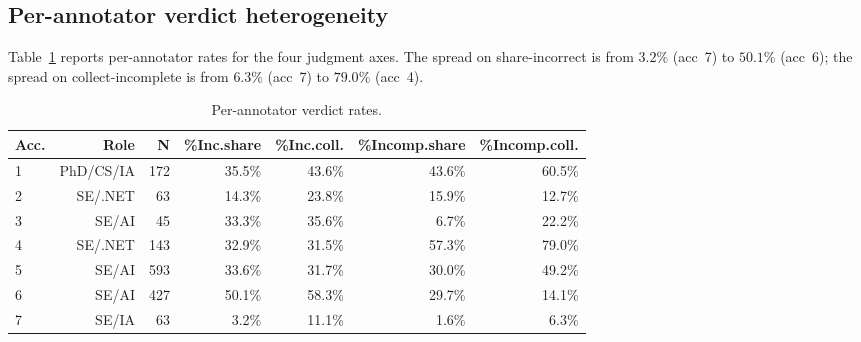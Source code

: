 \documentclass[11pt,a4paper]{article}
\begin{document}
\subsection{Per-annotator verdict heterogeneity}
Table~\ref{tab:per-ann} reports per-annotator rates for the four
judgment axes. The spread on share-incorrect is from $3.2\%$ (acc~7) to
$50.1\%$ (acc~6); the spread on collect-incomplete is from $6.3\%$
(acc~7) to $79.0\%$ (acc~4).

\begin{table}[t]
\centering\small
\caption{Per-annotator verdict rates.}
\label{tab:per-ann}
\begin{tabular}{lrrrrrr}
\toprule
Acc. & Role & N & \%Inc.share & \%Inc.coll. & \%Incomp.share & \%Incomp.coll.\\
\midrule
1 & PhD/CS/IA      & 172 & 35.5\% & 43.6\% & 43.6\% & 60.5\% \\
2 & SE/.NET        &  63 & 14.3\% & 23.8\% & 15.9\% & 12.7\% \\
3 & SE/AI          &  45 & 33.3\% & 35.6\% &  6.7\% & 22.2\% \\
4 & SE/.NET        & 143 & 32.9\% & 31.5\% & 57.3\% & 79.0\% \\
5 & SE/AI          & 593 & 33.6\% & 31.7\% & 30.0\% & 49.2\% \\
6 & SE/AI          & 427 & 50.1\% & 58.3\% & 29.7\% & 14.1\% \\
7 & SE/IA          &  63 &  3.2\% & 11.1\% &  1.6\% &  6.3\% \\
\bottomrule
\end{tabular}
\end{table}
\end{document}

